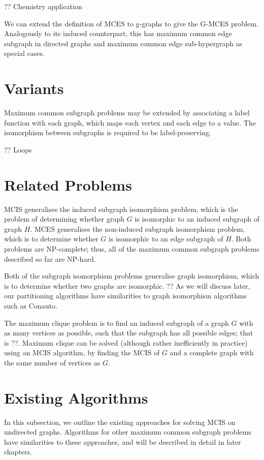 ?? Chemistry application

We can extend the definition of MCES to g-graphs to give the G-MCES problem.
Analogously to its induced counterpart, this has maximum common edge subgraph
in directed graphs and maximum common edge sub-hypergraph as special cases.

\section{Variants}

Maximum common subgraph problems may be extended by associating a label
function with each graph, which maps each vertex and each edge to a value. The
isomorphism between subgraphs is required to be label-preserving.

?? Loops

\section{Related Problems}

MCIS generalises the induced subgraph isomorphism problem, which is the problem
of determining whether graph $G$ is isomorphic to an induced subgraph of graph $H$.
MCES generalises the non-induced subgraph isomorphism problem, which is to
determine whether $G$ is isomorphic to an edge subgraph of $H$. Both problems are
NP-complete; thus, all of the maximum common subgraph problems described so far
are NP-hard.

Both of the subgraph isomorphism problems generalise graph isomorphism, which
is to determine whether two graphs are isomorphic. ?? As we will discuss later,
our partitioning algorithms have similarities to graph isomorphism algorithms
such as Conauto.

The maximum clique problem is to find an induced subgraph of a graph $G$ with as
many vertices as possible, such that the subgraph has all possible edges; that
is ??. Maximum clique can be solved (although rather inefficiently in practice)
using an MCIS algorithm, by finding the MCIS of $G$ and a complete graph with the
same number of vertices as $G$.

\section{Existing Algorithms}

In this subsection, we outline the existing approaches for solving MCIS on
undirected graphs. Algorithms for other maximum common subgraph problems have
similarities to these approaches, and will be described in detail in later
chapters.


